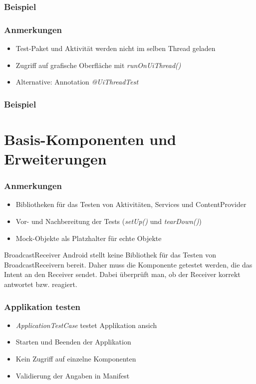 \begin{frame}
	\frametitle{Beispiel}
	
\end{frame}

\begin{frame}
	\frametitle{Anmerkungen}
	\begin{itemize}
		\item Test-Paket und Aktivität werden nicht im selben Thread geladen
		\item Zugriff auf grafische Oberfläche mit \emph{runOnUiThread()}
		\item Alternative: Annotation \emph{@UiThreadTest}
	\end{itemize}
\end{frame}

\begin{frame}
	\frametitle{Beispiel}
	
\end{frame}

\section{Basis-Komponenten und Erweiterungen}

\begin{frame}
	\frametitle{Anmerkungen}
	\begin{itemize}
		\item Bibliotheken für das Testen von Aktivitäten, Services und ContentProvider
		\item Vor- und Nachbereitung der Tests (\emph{setUp()} und \emph{tearDown()})
		\item Mock-Objekte als Platzhalter für echte Objekte
	\end{itemize}

	\begin{alertblock}{BroadcastReceiver}
		Android stellt keine Bibliothek für das Testen von BroadcastReceivern 
		bereit. Daher muss die Komponente getestet werden, die das Intent an den Receiver sendet. 
		Dabei überprüft man, ob der Receiver korrekt antwortet bzw. reagiert.
	\end{alertblock}
\end{frame}

\begin{frame}
	\frametitle{Applikation testen}
	\begin{itemize}
		\item \emph{ApplicationTestCase} testet Applikation ansich
		\item Starten und Beenden der Applikation
		\item Kein Zugriff auf einzelne Komponenten
		\item Validierung der Angaben in Manifest
	\end{itemize}
\end{frame}

